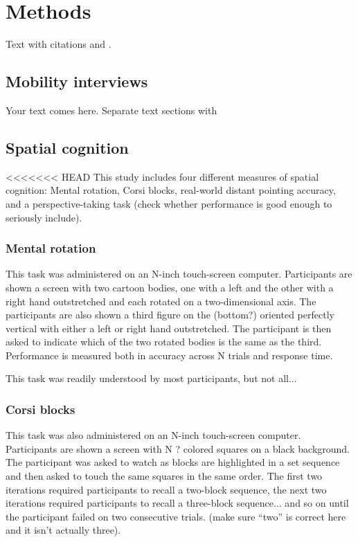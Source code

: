 \section{Methods}
\label{sec:2}
Text with citations \cite{RefB} and \cite{RefJ}.
	\subsection{Mobility interviews}
	\label{sec:2.1}
Your text comes here. Separate text sections with	
	\subsection{Spatial cognition}
	\label{sec:2.2}
<<<<<<< HEAD
This study includes four different measures of spatial cognition: Mental rotation, Corsi blocks, real-world distant pointing accuracy, and a perspective-taking task (check whether performance is good enough to seriously include).

		\subsubsection{Mental rotation}
		\label{sec:2.2.1}		
This task was administered on an N-inch touch-screen computer.  Participants are shown a screen with two cartoon bodies, one with a left and the other with a right hand outstretched and each rotated on a two-dimensional axis.  The participants are also shown a third figure on the (bottom?) oriented perfectly vertical with either a left or right hand outstretched.  The participant is then asked to indicate which of the two rotated bodies is the same as the third.  Performance is measured both in accuracy across N trials and response time.

This task was readily understood by most participants, but not all...		
	
		\subsubsection{Corsi blocks}
		\label{sec:2.2.2}
This task was also administered on an N-inch touch-screen computer.  Participants are shown a screen with N ? colored squares on a black background.  The participant was asked to watch as blocks are highlighted in a set sequence and then asked to touch the same squares in the same order.  The first two iterations required participants to recall a two-block sequence, the next two iterations required participants to recall a three-block sequence... and so on until the participant failed on two consecutive trials. (make sure ``two'' is correct here and it isn't actually three).

